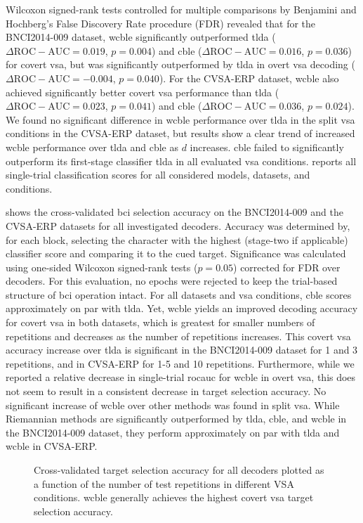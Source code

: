 Wilcoxon signed-rank tests controlled for multiple comparisons by Benjamini
and Hochberg's False Discovery Rate procedure (FDR) revealed that
for the BNCI2014-009 dataset, \ac{wcble} significantly outperformed \ac{tlda}
($\Delta\mathrm{ROC-AUC} = 0.019$, $p=0.004$) and \ac{cble}
($\Delta\mathrm{ROC-AUC} = 0.016$, $p=0.036$) for covert \ac{vsa},
but was significantly outperformed by \ac{tlda} in overt \ac{vsa} decoding
($\Delta\mathrm{ROC-AUC}=-0.004$, $p=0.040$).
For the CVSA-ERP dataset, \ac{wcble}
also achieved significantly better covert \ac{vsa} performance than \ac{tlda} ($\Delta\mathrm{ROC-AUC}
	= 0.023$, $p=0.041$) and \ac{cble} ($\Delta\mathrm{ROC-AUC}
	= 0.036$, $p=0.024$).
We found no significant difference in \ac{wcble} performance over \ac{tlda} in the split
\ac{vsa} conditions in the CVSA-ERP dataset, but results show a clear trend of
increased \ac{wcble} performance over \ac{tlda} and \ac{cble} as $d$ increases.
\ac{cble} failed to significantly outperform its first-stage classifier \ac{tlda} in all
evaluated \ac{vsa} conditions.
 reports all single-trial classification scores for all considered models, datasets, and conditions.


 shows the cross-validated \ac{bci} selection
accuracy on the BNCI2014-009 and the CVSA-ERP datasets for all investigated
decoders.
Accuracy was determined by, for each block, selecting the character with the
highest (stage-two if applicable) classifier score and comparing it to the cued target.
Significance was calculated using one-sided Wilcoxon signed-rank tests ($p=0.05$)
corrected for FDR over decoders.
For this evaluation, no epochs were rejected to keep the trial-based structure
of \ac{bci} operation intact.
For all datasets and \ac{vsa} conditions, \ac{cble} scores approximately on par with \ac{tlda}.
Yet, \ac{wcble} yields an improved decoding accuracy for covert \ac{vsa} in both
datasets, which is greatest for smaller numbers of repetitions and
decreases as the number of repetitions increases.
This covert \ac{vsa} accuracy increase over \ac{tlda} is significant in the
BNCI2014-009 dataset for 1 and 3 repetitions, and in CVSA-ERP for 1-5 and 10 repetitions.
Furthermore, while we reported a relative decrease in single-trial \ac{rocauc} for
\ac{wcble} in overt \ac{vsa}, this does not seem to result in a consistent decrease in target
selection accuracy.
No significant increase of \ac{wcble} over other methods was found in split \ac{vsa}.
While Riemannian methods are significantly outperformed by \ac{tlda}, \ac{cble}, and \ac{wcble}
in the BNCI2014-009 dataset, they perform approximately on par with \ac{tlda} and
\ac{wcble} in CVSA-ERP.
\begin{figure}[t]
		\label{fig:covert-align/block-eval}%
    
  \caption[Selection accuracy.]{%
		Cross-validated target selection accuracy for
    all decoders plotted as a function of the number of test repetitions in
    different VSA conditions. \ac{wcble} generally achieves the highest
    covert \ac{vsa} target selection accuracy.}
\end{figure}


